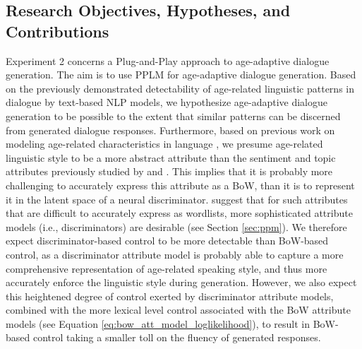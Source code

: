 \subsection{Research Objectives, Hypotheses, and Contributions}

Experiment 2 concerns a Plug-and-Play approach to age-adaptive dialogue generation.
The aim is to use PPLM for age-adaptive dialogue generation.
Based on the previously demonstrated detectability of age-related linguistic patterns in dialogue by text-based NLP models, we hypothesize age-adaptive dialogue generation to be possible to the extent that similar patterns can be discerned from generated dialogue responses.
Furthermore, based on previous work on modeling age-related characteristics in language \citep{pennebaker2003words, schler2006effects, nguyen2014gender, zheng2019personalized}, we presume age-related linguistic style to be a more abstract attribute than the sentiment and topic attributes previously studied by \cite{dathathri2019plug} and \cite{madotto-etal-2020-plug}. This implies that it is probably more challenging to accurately express this attribute as a BoW, than it is to represent it in the latent space of a neural discriminator. \cite{dathathri2019plug} suggest that for such attributes that are difficult to accurately express as wordlists, more sophisticated attribute models (i.e., discriminators) are desirable (see Section \ref{sec:ppm}). We therefore expect discriminator-based control to be more detectable than BoW-based control, as a discriminator attribute model is probably able to capture a more comprehensive representation of age-related speaking style, and thus more accurately enforce the linguistic style during generation. However, we also expect this heightened degree of control exerted by discriminator attribute models, combined with the more lexical level control associated with the BoW attribute models (see Equation \ref{eq:bow_att_model_loglikelihood}), to result in BoW-based control taking a smaller toll on the fluency of generated responses. 



